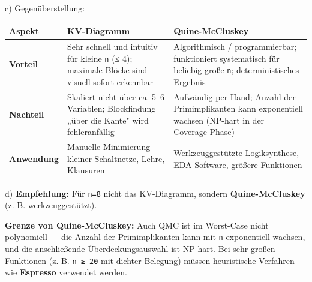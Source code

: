 \documentclass[11pt, a4paper]{article}
\begin{document}
c) Gegenüberstellung:



{\small
\begin{tabularx}{\linewidth}{XXX}
\hline
\rowcolor{tableheadbg}
{\color{white}\textbf{Aspekt}} & {\color{white}\textbf{KV-Diagramm}} & {\color{white}\textbf{Quine-McCluskey}} \\[2pt]
\hline
\endhead
\hline
\endfoot
\textbf{Vorteil} & Sehr schnell und intuitiv für kleine \texttt{n} (≤ 4); maximale Blöcke sind visuell sofort erkennbar & Algorithmisch / programmierbar; funktioniert systematisch für beliebig große \texttt{n}; deterministisches Ergebnis \\
\textbf{Nachteil} & Skaliert nicht über ca. 5–6 Variablen; Blockfindung „über die Kante" wird fehleranfällig & Aufwändig per Hand; Anzahl der Primimplikanten kann exponentiell wachsen (NP-hart in der Coverage-Phase) \\
\textbf{Anwendung} & Manuelle Minimierung kleiner Schaltnetze, Lehre, Klausuren & Werkzeuggestützte Logiksynthese, EDA-Software, größere Funktionen \\
\end{tabularx}
}


d) \textbf{Empfehlung:} Für \texttt{n=8} nicht das KV-Diagramm, sondern \textbf{Quine-McCluskey} (z. B. werkzeuggestützt).


\textbf{Grenze von Quine-McCluskey:} Auch QMC ist im Worst-Case nicht polynomiell — die Anzahl der Primimplikanten kann mit \texttt{n} exponentiell wachsen, und die anschließende Überdeckungsauswahl ist NP-hart. Bei sehr großen Funktionen (z. B. \texttt{n ≥ 20} mit dichter Belegung) müssen heuristische Verfahren wie \textbf{Espresso} verwendet werden.





\end{document}
